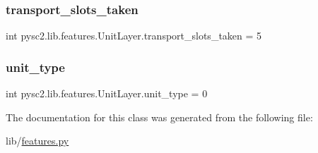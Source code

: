 \subsubsection{\texorpdfstring{transport\+\_\+slots\+\_\+taken}{transport\_slots\_taken}}
{\footnotesize\ttfamily int pysc2.\+lib.\+features.\+Unit\+Layer.\+transport\+\_\+slots\+\_\+taken = 5\hspace{0.3cm}{\ttfamily [static]}}

\mbox{\label{classpysc2_1_1lib_1_1features_1_1_unit_layer_a52b3f860e08bacbf1bd6d7e443c4f772}} 
\subsubsection{\texorpdfstring{unit\+\_\+type}{unit\_type}}
{\footnotesize\ttfamily int pysc2.\+lib.\+features.\+Unit\+Layer.\+unit\+\_\+type = 0\hspace{0.3cm}{\ttfamily [static]}}



The documentation for this class was generated from the following file\+:\begin{DoxyCompactItemize}
\item 
lib/\mbox{\hyperlink{features_8py}{features.\+py}}\end{DoxyCompactItemize}
